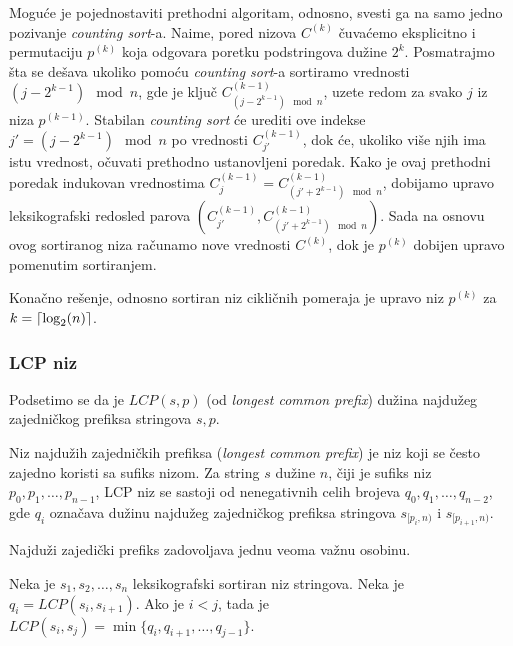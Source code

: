 Mogu\' ce je pojednostaviti prethodni algoritam, odnosno, svesti ga na samo jedno pozivanje \textit{counting sort}-a. Naime, pored nizova $C^{(k)}$ \v cuva\' cemo eksplicitno i permutaciju $p^{(k)}$ koja odgovara poretku podstringova du\v zine $2^k$. Posmatrajmo \v sta se de\v sava ukoliko pomo\' cu \textit{counting sort}-a sortiramo vrednosti $(j - 2^{k-1}) \mod n$, gde je klju\v c $C^{(k-1)}_{(j - 2^{k-1}) \mod n}$, uzete redom za svako $j$ iz niza $p^{(k-1)}$. Stabilan \textit{counting sort} \' ce urediti ove indekse $j' = (j - 2^{k-1}) \mod n$ po vrednosti $C^{(k-1)}_{j'}$, dok \' ce, ukoliko vi\v se njih ima istu vrednost, o\v cuvati prethodno ustanovljeni poredak. Kako je ovaj prethodni poredak indukovan vrednostima $C^{(k-1)}_j = C^{(k-1)}_{(j' + 2^{k-1}) \mod n}$, dobijamo upravo leksikografski redosled parova $(C^{(k-1)}_{j'}, C^{(k-1)}_{(j' + 2^{k-1}) \mod n})$. Sada na osnovu ovog sortiranog niza ra\v cunamo nove vrednosti $C^{(k)}$, dok je $p^{(k)}$ dobijen upravo pomenutim sortiranjem.

Kona\v cno re\v senje, odnosno sortiran niz cikli\v cnih pomeraja je upravo niz $p^{(k)}$ za $k = \left \lceil \log_2(n) \right \rceil$.

\noindent
\begin{minipage}[l]{\textwidth}

\end{minipage}

\subsubsection{LCP niz}

Podsetimo se da je $LCP(s,p)$ (od \textit{longest common prefix}) du\v zina najdu\v zeg zajedni\v ckog prefiksa stringova $s,p$.

Niz najdu\v zih zajedni\v ckih prefiksa (\textit{longest common prefix}) je niz koji se \v cesto zajedno koristi sa sufiks nizom. Za string $s$ du\v zine $n$, \v ciji je sufiks niz $p_0, p_1, \ldots, p_{n-1}$, LCP niz se sastoji od nenegativnih celih brojeva $q_0, q_1, \ldots, q_{n-2}$, gde $q_i$ ozna\v cava du\v zinu najdu\v zeg zajedni\v ckog prefiksa stringova $s_{[p_i, n)}$ i $s_{[p_{i+1}, n)}$.

Najdu\v zi zajedi\v cki prefiks zadovoljava jednu veoma va\v znu osobinu.

\begin{thm}
\label{lcposobina}
Neka je $s_1, s_2, \ldots, s_n$ leksikografski sortiran niz stringova. Neka je $q_i = LCP(s_i, s_{i+1})$. Ako je $i<j$, tada je $LCP(s_i, s_j) = \min\{q_i, q_{i+1}, \ldots, q_{j-1}\}$. 
\end{thm}

